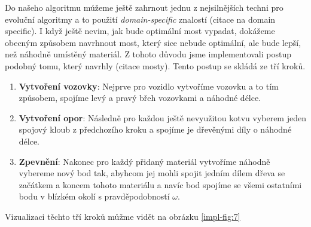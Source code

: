 Do našeho algoritmu múžeme ještě zahrnout jednu z nejsilnějších techni pro evoluční algoritmy a to použití \textit{domain-specific} znalostí (citace na domain specific). I když ještě nevim, jak bude optimální most vypadat, dokážeme obecným způsobem navrhnout most, který sice nebude optimální, ale bude lepší, než náhodně umístěný materiál. Z tohoto důvodu jsme implementovali postup podobný tomu, který navrhly (citace mosty). Tento postup se skládá ze tří kroků.

\begin{enumerate}
    \item \textbf{Vytvoření vozovky}: Nejprve pro vozidlo vytvoříme vozovku a to tím způsobem, spojíme levý a pravý břeh vozovkami a náhodné délce.
    \item \textbf{Vytvoření opor}: Následně pro každou ještě nevyužitou kotvu vyberem jeden spojový kloub z předchozího kroku a spojíme je dřevěnými díly o náhodné délce.
    \item \textbf{Zpevnění}: Nakonec pro každý přidaný materiál vytvoříme náhodně vybereme nový bod tak, abyhcom jej mohli spojit jedním dílem dřeva se začátkem a koncem tohoto materiálu a navíc bod spojíme se všemi ostatními bodu v blízkém okolí s pravděpodobností $\omega$.
\end{enumerate}

Vizualizaci těchto tří kroků můžme vidět na obrázku \ref{impl-fig:7}

